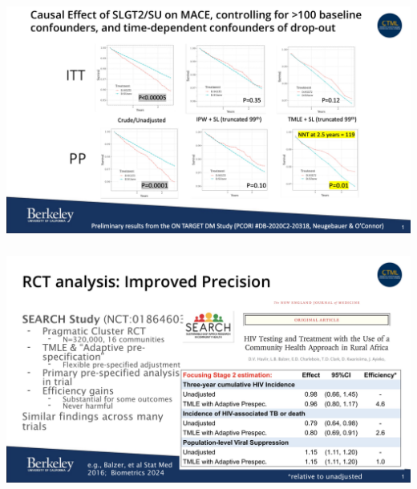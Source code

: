 \documentclass[t]{beamer}
\begin{document}
\begin{frame}
\frametitle{}
\vspace{20pt}
\begin{center}
\includegraphics[width=\textwidth]{figures/5-FDA-RWE-Subcommittee.pdf}
\end{center}
\vspace{35pt}
\end{frame}
\begin{frame}
\frametitle{}
\vspace{20pt}
\begin{center}
\includegraphics[width=\textwidth]{figures/6-FDA-RWE-Subcommittee.pdf}
\end{center}
\vspace{35pt}
\end{frame}
\end{document}
